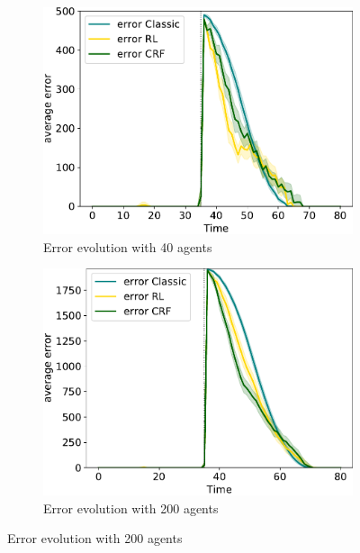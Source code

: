 \begin{figure}[t!]
  \begin{subfigure}[t]{\figfactor\textwidth}
    \centering
    \includegraphics[width=\textwidth]{papers/coordination2022/img/error-few-nodes.pdf}
    \caption{Error evolution with 40 agents}
    \label{subfig:error-few}
  \end{subfigure}
  \hfill
  \begin{subfigure}[t]{\figfactor\textwidth}
    \centering
    \includegraphics[width=\textwidth]{papers/coordination2022/img/error-many-nodes.pdf}
    \caption{Error evolution with 200 agents}
    \label{subfig:error-many}
  \end{subfigure}
  \bigskip
  

\end{figure}
